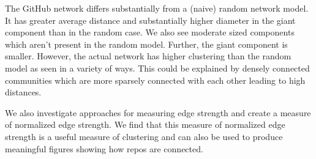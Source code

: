 \documentclass{pset}
\begin{document}
The GitHub network differs substantially from a (naive) random network model.
It has
greater average distance and substantially higher diameter in the giant
component than in the random case. We also see moderate sized components which
aren't present in the random model. Further, the giant component is smaller. However,
the actual network has higher clustering  than the random model as seen in
a variety of ways. This could be explained by densely connected communities
which are more sparsely connected with each other leading to high distances. 

We also investigate approaches for measuring edge strength and create
a measure of normalized edge strength.
We find that this measure of normalized edge strength is a useful measure
of clustering and can also be used to produce meaningful figures showing
how repos are connected.

\printbibliography{}
\end{document}
